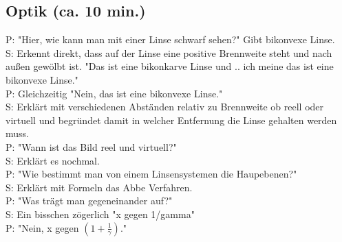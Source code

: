 \documentclass[10pt]{article}
\begin{document}
\begin{multicols}{2}
\section{Optik (ca. 10 min.)}
P: "Hier, wie kann man mit einer Linse schwarf sehen?" Gibt bikonvexe Linse.\\
S: Erkennt direkt, dass auf der Linse eine positive Brennweite steht und nach außen gewölbt ist. "Das ist eine bikonkarve Linse und .. ich meine das ist eine bikonvexe Linse."\\
P: Gleichzeitig "Nein, das ist eine bikonvexe Linse."\\
S: Erklärt mit verschiedenen Abständen relativ zu Brennweite ob reell oder virtuell und begründet damit in welcher Entfernung die Linse gehalten werden muss.\\
P: "Wann ist das Bild reel und virtuell?"\\
S: Erklärt es nochmal.\\
P: "Wie bestimmt man von einem Linsensystemen die Haupebenen?" \\
S: Erklärt mit Formeln das Abbe Verfahren.\\
P: "Was trägt man gegeneinander auf?" \\
S: Ein bisschen zögerlich "x gegen 1/gamma"\\
P: "Nein, x gegen \((1+\frac{1}{\gamma})\)."\\


\end{multicols}
\end{document}
